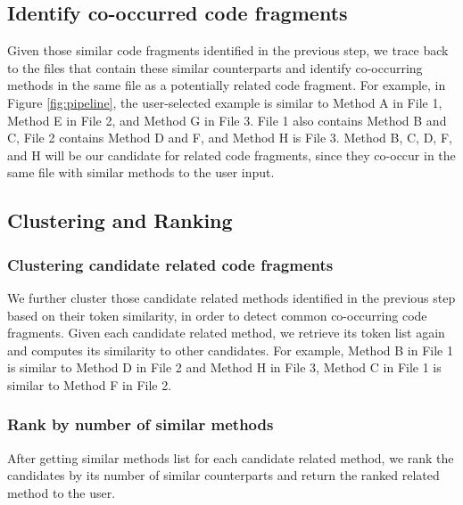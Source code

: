 \subsection{Identify co-occurred code fragments}
Given those similar code fragments identified in the previous step, we trace back to the files that contain these similar counterparts and identify co-occurring methods in the same file as a potentially related code fragment.   For example, in Figure \ref{fig:pipeline}, the user-selected example is similar to Method A in File 1, Method E in File 2, and Method G in File 3. File 1 also contains Method B and C, File 2 contains Method D and F, and Method H is File 3. Method B, C, D, F, and H will be our candidate for related code fragments, since they co-occur in the same file with similar methods to the user input. 

\subsection{Clustering and Ranking}
\subsubsection{Clustering candidate related code fragments}
We further cluster those candidate related methods identified in the previous step based on their token similarity, in order to detect common co-occurring code fragments. Given each candidate related method, we retrieve its token list again and computes its similarity to other candidates. For example, Method B in File 1 is similar to Method D in File 2 and Method H in File 3, Method C in File 1 is similar to Method F in File 2.  

\subsubsection{Rank by number of similar methods}
After getting similar methods list for each candidate related method, we rank the candidates by its number of similar counterparts and return the ranked related method to the user.